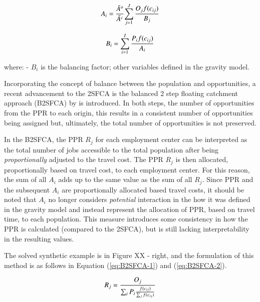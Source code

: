 \documentclass[]{elsarticle} %
\begin{document}
\begin{equation}
\label{eq:Inverse-balancing-1}
A_{i} = \frac{\bar A^{o}}{\bar A^{c}}{\sum_{j=1}^{J} \frac{O_{j}f(c_{ij})}{B_{j}}}\\
\end{equation}

\begin{equation}
\label{eq:Inverse-balancing-2}
B_{i} = {\sum_{i=1}^{I} \frac{P_{i}f(c_{ij})}{A_{i}}}\\
\end{equation}

\noindent where: - \(B_{i}\) is the balancing factor; other variables
defined in the gravity model.

Incorporating the concept of balance between the population and
opportunities, a recent advancement to the 2SFCA is the balanced 2 step
floating catchment approach (B2SFCA) by \citep{paez2019} is introduced.
In both steps, the number of opportunities from the PPR to each origin,
this results in a consistent number of opportunities being assigned but,
ultimately, the total number of opportunities is not preserved.

In the B2SFCA, the PPR \(R_{j}\) for each employment center can be
interpreted as the total number of jobs accessible to the total
population after being \emph{proportionally} adjusted to the travel
cost. The PPR \(R_{j}\) is then allocated, proportionally based on
travel cost, to each employment center. For this reason, the sum of all
\(A_{i}\) adds up to the same value as the sum of all \(R_{j}\). Since
PPR and the subsequent \(A_{i}\) are proportionally allocated based
travel costs, it should be noted that \(A_{i}\) no longer considers
\emph{potential} interaction in the how it was defined in the gravity
model \citep{hansen1959} and instead represent the allocation of PPR,
based on travel time, to each population. This measure introduces some
consistency in how the PPR is calculated (compared to the 2SFCA), but is
still lacking interpretability in the resulting values.

The solved synthetic example is in Figure XX - right, and the
formulation of this method is as follows in Equation (\ref{eq:B2SFCA-1})
and (\ref{eq:B2SFCA-2}).

\begin{equation}
\label{eq:B2SFCA-1}
R_{j} = \frac{O_{j}}{\sum_i P_{i} \frac{f(c_{ij})}{\sum_j f(c_{ij})}}\\
\end{equation}
\end{document}
